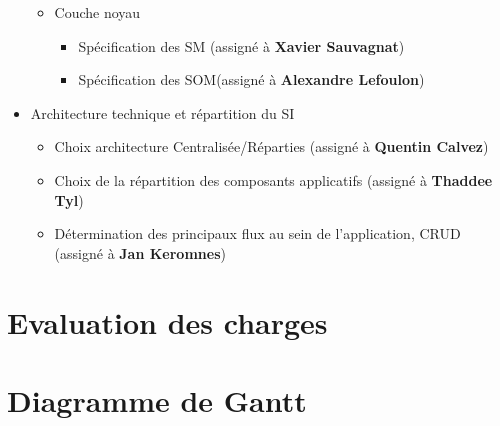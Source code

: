 \begin{itemize}
\begin{itemize}
\item Couche noyau

\begin{itemize}
\item Spécification des SM (assigné à \textbf{Xavier Sauvagnat})
\item Spécification des SOM(assigné à \textbf{Alexandre Lefoulon})
\end{itemize}

\end{itemize}

\item Architecture technique et répartition du SI

\begin{itemize}
\item Choix architecture Centralisée/Réparties (assigné à \textbf{Quentin Calvez})
\item Choix de la répartition des composants applicatifs (assigné à \textbf{Thaddee Tyl})
\item Détermination des principaux flux au sein de l'application, CRUD (assigné à \textbf{Jan Keromnes})
\end{itemize}

\end{itemize}

\section{Evaluation des charges}



\section{Diagramme de Gantt}


